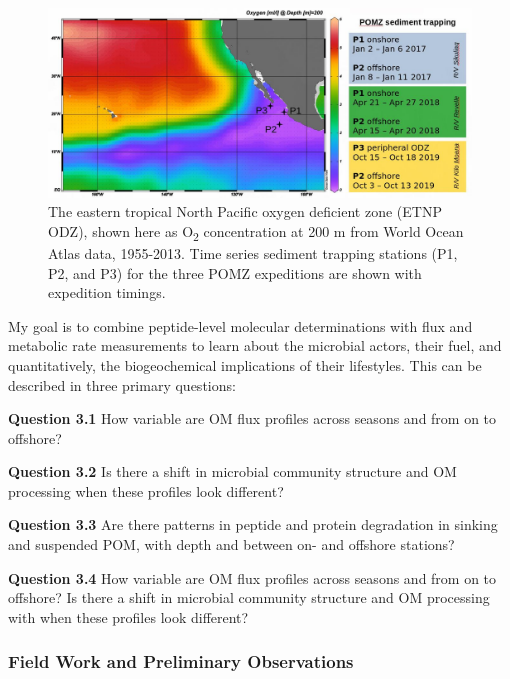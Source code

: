\documentclass[12pt, letterpaper, twoside]{article}
\begin{document}
\bigskip

\begin{figure}
	\includegraphics[width=\linewidth]{pomz-sed-trap-sta.jpg}
	\caption{The eastern tropical North Pacific oxygen deficient zone (ETNP ODZ), shown here as O\textsubscript{2} concentration at 200 m from World Ocean Atlas data, 1955-2013. Time series sediment trapping stations (P1, P2, and P3) for the three POMZ expeditions are shown with expedition timings.}
	\label{fig:etnp map}
\end{figure}

My goal is to combine peptide-level molecular determinations with flux and metabolic rate measurements to learn about the microbial actors, their fuel, and quantitatively, the biogeochemical implications of their lifestyles. This can be described in three primary questions:

\bigskip

\textbf{Question 3.1} How variable are OM flux profiles across seasons and from on to offshore? 

\bigskip

\textbf{Question 3.2} Is there a shift in microbial community structure and OM processing when these profiles look different?

\bigskip

\textbf{Question 3.3} Are there patterns in peptide and protein degradation in sinking and suspended POM, with depth and between on- and offshore stations?

\bigskip

\textbf{Question 3.4} How variable are OM flux profiles across seasons and from on to offshore? Is there a shift in microbial community structure and OM processing with  when these profiles look different?



\subsubsection{Field Work and Preliminary Observations}
\end{document}
